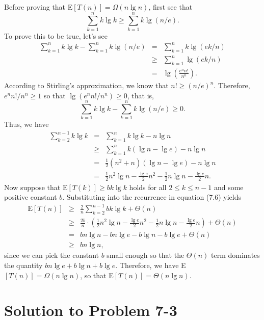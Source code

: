 \documentclass[a4paper, fleqn]{article}
\begin{document}
\begin{enumerate}
Before proving that E$[T(n)] = \Omega(n \lg n)$, first see that
\[
\sum_{k = 1}^{n} k \lg k \geq \sum_{k = 1}^{n} k \lg (n / e).
\]
To prove this to be true, let's see
\begin{eqnarray*}
\sum_{k = 1}^{n} k \lg k - \sum_{k = 1}^{n} k \lg (n / e)
&   =  & \sum_{k = 1}^n k \lg (ek / n) \\
& \geq & \sum_{k = 1}^n \lg (ek / n) \\
&   =  & \lg \left(\frac{e^n n!}{n^n}\right).
\end{eqnarray*}
According to Stirling's approximation, we know that $n! \geq (n / e)^n$. 
Therefore, $e^n n! / n^n \geq 1$ so that $\lg (e^n n! / n^n) \geq 0$, that is,
\[
\sum_{k = 1}^{n} k \lg k - \sum_{k = 1}^{n} k \lg (n / e) \geq 0.
\]
Thus, we have
\begin{eqnarray*}
\sum_{k = 2}^{n - 1} k \lg k
&   =  & \sum_{k = 1}^{n} k \lg k - n \lg n \\
& \geq & \sum_{k = 1}^{n} k (\lg n - \lg e) - n \lg n \\
&   =  & \frac{1}{2} (n^2 + n)(\lg n - \lg e) - n \lg n \\
&   =  & \frac{1}{2} n^2 \lg n - \frac{\lg e}{2} n^2 - \frac{1}{2} n \lg n - \frac{\lg e}{2} n.
\end{eqnarray*}
Now suppose that $\mbox{E}[T(k)] \geq bk \lg k$ holds for all $2 \leq k \leq n - 1$ 
and some positive constant $b$. Substituting into the recurrence in equation 
(7.6) yields
\begin{eqnarray*}
\mbox{E}[T(n)]
& \geq & \frac{2}{n} \sum_{k = 2}^{n - 1} bk \lg k + \Theta(n) \\
& \geq & \frac{2b}{n} \cdot \left(\frac{1}{2} n^2 \lg n - \frac{\lg e}{2} n^2 - \frac{1}{2} n \lg n - \frac{\lg e}{2} n\right) + \Theta(n) \\
&   =  & bn \lg n - bn\lg e - b \lg n - b \lg e + \Theta(n) \\
& \geq & bn \lg n,
\end{eqnarray*}
since we can pick the constant $b$ small enough so that the $\Theta(n)$ term 
dominates the quantity $bn\lg e + b \lg n + b \lg e$. Therefore, we have 
E$[T(n)] = \Omega(n \lg n)$, so that E$[T(n)] = \Theta(n \lg n)$.

\end{enumerate}







\section*{Solution to Problem 7-3}
\end{document}
